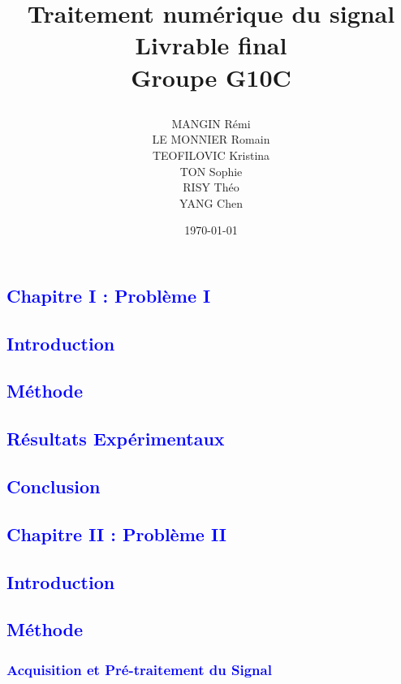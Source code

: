 \documentclass{article}
\title{\begin{figure}[H]
\subfigure{
\label{Logo_isep}
\texttt{[image: logo\_isep.png]}
}
\subfigure{
\label{Logo_data_waves}
\texttt{[image: logo\_data\_waves.png]}

}
\end{figure}
Traitement numérique du signal \\ \vspace{5mm} Livrable final \\ \vspace{3mm} Groupe G10C }
\author{MANGIN Rémi \\
LE MONNIER Romain \\
TEOFILOVIC Kristina \\
TON Sophie \\
RISY Théo \\
YANG Chen}
\date{\today}
\numberwithin{equation}{section}
\begin{document}
\maketitle

\newpage
\tableofcontents
\newpage

\newpage
\textcolor{blue}{\section{Chapitre I : Problème I}}
\textcolor{blue}{\subsection{Introduction}}

\newpage
\textcolor{blue}{\subsection{Méthode}}
\newpage
\textcolor{blue}{\subsection{Résultats Expérimentaux}}

\newpage
\textcolor{blue}{\subsection{Conclusion}}

\newpage
\textcolor{blue}{\section{Chapitre II : Problème II}}
\textcolor{blue}{\subsection{Introduction}}

\newpage
\textcolor{blue}{\subsection{Méthode}}

\textcolor{blue}{\subsubsection{Acquisition et Pré-traitement du Signal}}

\end{document}
